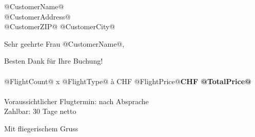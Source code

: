 \documentclass{scrlttr2}
\begin{document}
\begin{letter}
{@CustomerName@\\
@CustomerAddress@\\
@CustomerZIP@ @CustomerCity@
}
\opening{Sehr geehrte Frau @CustomerName@,}

Besten Dank für Ihre Buchung!\\
\\
@FlightCount@ x @FlightType@ à CHF @FlightPrice@\hfill \textbf{CHF @TotalPrice@}\\
\\
Voraussichtlicher Flugtermin: nach Absprache\\
Zahlbar: 30 Tage netto

\closing{Mit fliegerischem Gruss}
\end{letter}
\end{document}
